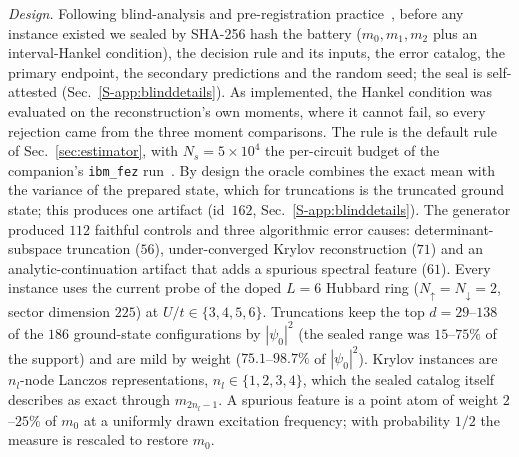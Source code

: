 \documentclass[aps,prb,reprint,onecolumn,12pt,superscriptaddress,longbibliography,floatfix]{revtex4-2}
\begin{document}
\emph{Design.} Following blind-analysis and pre-registration practice~\cite{KleinRoodman2005,Nosek2018}, before any instance existed we sealed by SHA-256 hash the battery ($m_0,m_1,m_2$ plus an interval-Hankel condition), the decision rule and its inputs, the error catalog, the primary endpoint, the secondary predictions and the random seed; the seal is self-attested (Sec.~\ref{S-app:blinddetails}). As implemented, the Hankel condition was evaluated on the reconstruction's own moments, where it cannot fail, so every rejection came from the three moment comparisons. The rule is the default rule of Sec.~\ref{sec:estimator}, with $N_s=5\times10^4$ the per-circuit budget of the companion's \texttt{ibm\_fez} run~\cite{SQDspec2608}. By design the oracle combines the exact mean with the variance of the prepared state, which for truncations is the truncated ground state; this produces one artifact (id~$162$, Sec.~\ref{S-app:blinddetails}). The generator produced $112$ faithful controls and three algorithmic error causes: determinant-subspace truncation ($56$), under-converged Krylov reconstruction ($71$) and an analytic-continuation artifact that adds a spurious spectral feature ($61$). Every instance uses the current probe of the doped $L=6$ Hubbard ring ($N_\uparrow=N_\downarrow=2$, sector dimension $225$) at $U/t\in\{3,4,5,6\}$. Truncations keep the top $d=29$--$138$ of the $186$ ground-state configurations by $|\psi_0|^2$ (the sealed range was $15$--$75\%$ of the support) and are mild by weight ($75.1$--$98.7\%$ of $|\psi_0|^2$). Krylov instances are $n_l$-node Lanczos representations, $n_l\in\{1,2,3,4\}$, which the sealed catalog itself describes as exact through $m_{2n_l-1}$. A spurious feature is a point atom of weight $2$--$25\%$ of $m_0$ at a uniformly drawn excitation frequency; with probability $1/2$ the measure is rescaled to restore $m_0$.
\end{document}
